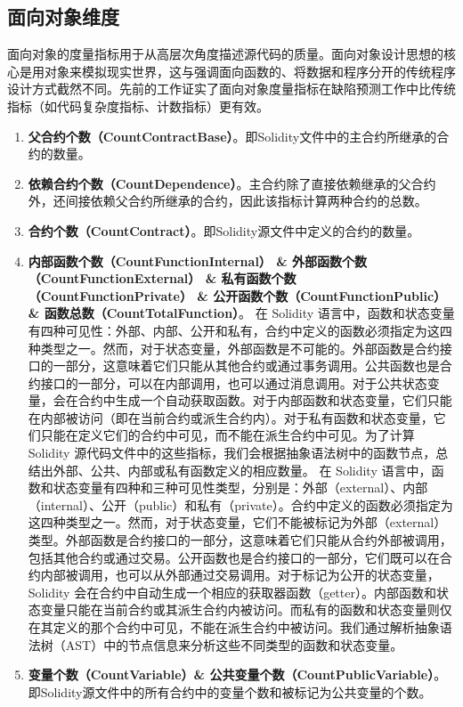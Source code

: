 \subsection{面向对象维度}
面向对象的度量指标用于从高层次角度描述源代码的质量。面向对象设计思想的核心是用对象来模拟现实世界，这与强调面向函数的、将数据和程序分开的传统程序设计方式截然不同。先前的工作\cite{martin1994oodesign,basili1996validation,KHAN20071}证实了面向对象度量指标在缺陷预测工作中比传统指标（如代码复杂度指标、计数指标）更有效。
\begin{enumerate}[label=\Alph*., align=left, leftmargin=*]
    \item \textbf{父合约个数（CountContractBase）}。即Solidity文件中的主合约所继承的合约的数量。

    \item \textbf{依赖合约个数（CountDependence）}。主合约除了直接依赖继承的父合约外，还间接依赖父合约所继承的合约，因此该指标计算两种合约的总数。

    \item \textbf{合约个数（CountContract）}。即Solidity源文件中定义的合约的数量。

    \item \textbf{内部函数个数（CountFunctionInternal） \& 外部函数个数（CountFunctionExternal） \& 私有函数个数（CountFunctionPrivate） \& 公开函数个数（CountFunctionPublic） \& 函数总数（CountTotalFunction）}。 在 Solidity 语言中，函数和状态变量有四种可见性：外部、内部、公开和私有，合约中定义的函数必须指定为这四种类型之一。然而，对于状态变量，外部函数是不可能的。外部函数是合约接口的一部分，这意味着它们只能从其他合约或通过事务调用。公共函数也是合约接口的一部分，可以在内部调用，也可以通过消息调用。对于公共状态变量，会在合约中生成一个自动获取函数。对于内部函数和状态变量，它们只能在内部被访问（即在当前合约或派生合约内）。对于私有函数和状态变量，它们只能在定义它们的合约中可见，而不能在派生合约中可见。为了计算 Solidity 源代码文件中的这些指标，我们会根据抽象语法树中的函数节点，总结出外部、公共、内部或私有函数定义的相应数量。
    在 Solidity 语言中，函数和状态变量有四种和三种可见性类型，分别是：外部（external）、内部（internal）、公开（public）和私有（private）。合约中定义的函数必须指定为这四种类型之一。然而，对于状态变量，它们不能被标记为外部（external）类型。外部函数是合约接口的一部分，这意味着它们只能从合约外部被调用，包括其他合约或通过交易。公开函数也是合约接口的一部分，它们既可以在合约内部被调用，也可以从外部通过交易调用。对于标记为公开的状态变量，Solidity 会在合约中自动生成一个相应的获取器函数（getter）。内部函数和状态变量只能在当前合约或其派生合约内被访问。而私有的函数和状态变量则仅在其定义的那个合约中可见，不能在派生合约中被访问。我们通过解析抽象语法树（AST）中的节点信息来分析这些不同类型的函数和状态变量。
    \item \textbf{变量个数（CountVariable）\& 公共变量个数（CountPublicVariable）}。即Solidity源文件中的所有合约中的变量个数和被标记为公共变量的个数。
\end{enumerate}
